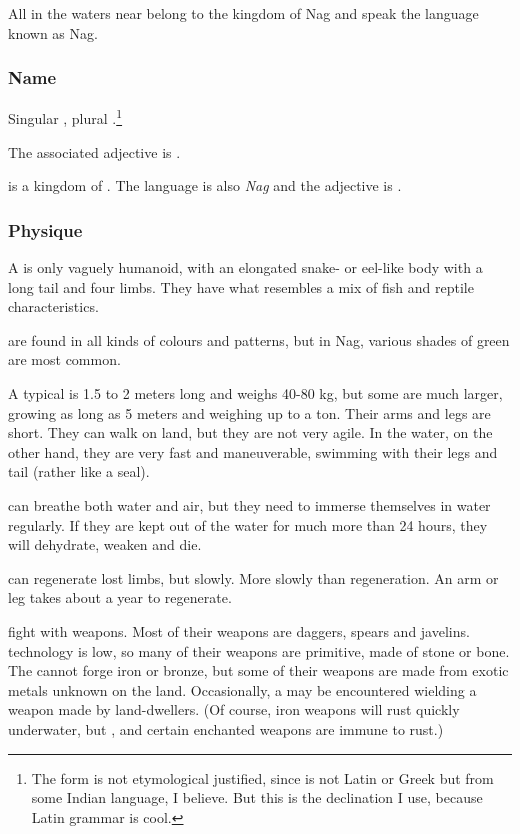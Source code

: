All \nagae{} in the waters near \KnownWorld{} belong to the kingdom of Nag and speak the language known as Nag. 

\subsubsection{Name}
Singular , plural .\footnote{The form \quo{\nagae{}} is not etymological justified, since \quo{\naga{}} is not Latin or Greek but from some Indian language, I believe. But this is the declination I use, because Latin grammar is cool.} 

The associated adjective is \emph{\naga{}}. 

 is a kingdom of \nagae{}. The language is also \emph{Nag} and the adjective is . 

\subsubsection{Physique}
A \naga{} is only vaguely humanoid, with an elongated snake- or eel-like body with a long tail and four limbs. They have what resembles a mix of fish and reptile characteristics. 

\Nagae{} are found in all kinds of colours and patterns, but in Nag, various shades of green are most common. 

A typical \naga{} is 1.5 to 2 meters long and weighs 40-80 kg, but some are much larger, growing as long as 5 meters and weighing up to a ton. Their arms and legs are short. They can walk on land, but they are not very agile. In the water, on the other hand, they are very fast and maneuverable, swimming with their legs and tail (rather like a seal). 

\Nagae{} can breathe both water and air, but they need to immerse themselves in water regularly. If they are kept out of the water for much more than 24 hours, they will dehydrate, weaken and die. 

\Nagae{} can regenerate lost limbs, but slowly. More slowly than \meccaran{} regeneration. An arm or leg takes about a year to regenerate. 

\Nagae{} fight with weapons. Most of their weapons are daggers, spears and javelins. \Naga{} technology is low, so many of their weapons are primitive, made of stone or bone. The \nagae{} cannot forge iron or bronze, but some of their weapons are made from exotic metals unknown on the land. Occasionally, a \naga{} may be encountered wielding a weapon made by land-dwellers. (Of course, iron weapons will rust quickly underwater, but \dragonsteel, \truesilver{} and certain enchanted weapons are immune to rust.) 

